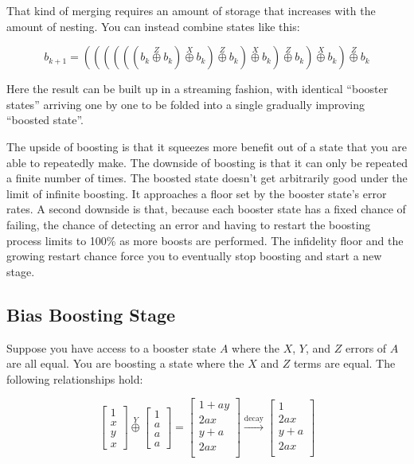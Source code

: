 \documentclass[onecolumn,unpublished,a4paper]{quantumarticle}
\theoremstyle{definition}
\theoremstyle{definition}
\theoremstyle{definition}
\begin{document}
That kind of merging requires an amount of storage that increases with the amount of nesting.
You can instead combine states like this:

\begin{equation}
b_{k+1} = \left(\left(\left(\left(\left(\left(b_k \stackrel{Z}\oplus b_k\right) \stackrel{X}\oplus b_k\right) \stackrel{Z}\oplus b_k\right) \stackrel{X}\oplus b_k\right) \stackrel{Z}\oplus b_k\right) \stackrel{X}\oplus b_k\right) \stackrel{Z}\oplus b_k
\end{equation}

Here the result can be built up in a streaming fashion, with identical ``booster states'' arriving one by one to be folded into a single gradually improving ``boosted state''.

The upside of boosting is that it squeezes more benefit out of a state that you are able to repeatedly make.
The downside of boosting is that it can only be repeated a finite number of times.
The boosted state doesn't get arbitrarily good under the limit of infinite boosting.
It approaches a floor set by the booster state's error rates.
A second downside is that, because each booster state has a fixed chance of failing, the chance of detecting an error and having to restart the boosting process limits to 100\% as more boosts are performed.
The infidelity floor and the growing restart chance force you to eventually stop boosting and start a new stage.

\subsection{Bias Boosting Stage}

Suppose you have access to a booster state $A$ where the $X$, $Y$, and $Z$ errors of $A$ are all equal.
You are boosting a state where the $X$ and $Z$ terms are equal.
The following relationships hold:

\begin{equation}
\begin{bmatrix}1\\x\\y\\x\end{bmatrix}
\stackrel{Y}{\oplus}
\begin{bmatrix}1\\a\\a\\a\end{bmatrix}
=\begin{bmatrix}
1 + ay\\
2ax\\
y + a\\
2ax\\
\end{bmatrix}
\xrightarrow{\text{decay}}\begin{bmatrix}
1\\
2a x\\
y + a\\
2a x\\
\end{bmatrix}
\end{equation}
\end{document}
